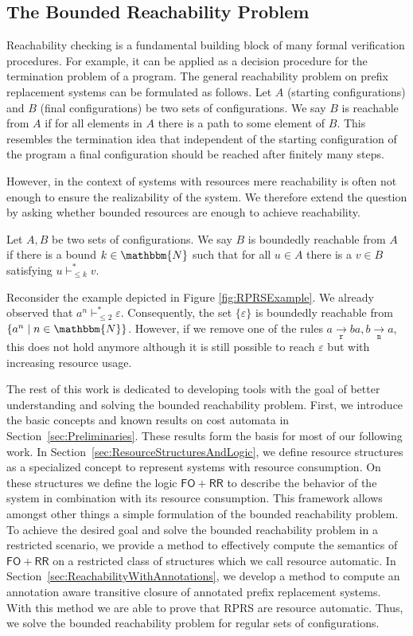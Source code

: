 \documentclass{LMCS}
\newcommand{\apath}[2][]{\xrightarrow[#1]{#2}}
\newcommand{\nat}{\mathbbm{N}}
\newcommand{\eps}{\varepsilon}
\newcommand{\configstepsLesserCost}[2][*]{\vdash^{#1}_{\le #2}}
\newcommand{\FORR}{\ensuremath{\mathsf{FO\!\!+\!\!RR}}}
\newcommand{\rOp}{\ensuremath{\mathtt{r}}}
\newcommand{\nOp}{\ensuremath{\mathtt{n}}}
\newcommand{\RPRS}{\textsf{RPRS}}
\begin{document}
\subsection{The Bounded Reachability Problem}
\label{subsec:BoundedReachability}

Reachability checking is a fundamental building block of many formal
verification procedures. For example, it can be applied as a decision procedure
for the termination problem of a program. The general reachability problem 
on prefix replacement systems can be formulated as follows. Let $A$ (starting 
configurations) and $B$ (final configurations) be two sets of
configurations. We say $B$ is reachable from $A$ if for all elements
in $A$ there is a path to some element of $B$. This resembles the termination
idea that independent of the starting configuration of the program a final
configuration should be reached after finitely many steps.


However, in the context of systems with resources mere reachability is
often not enough to ensure the realizability of the system. 
We therefore extend the question by asking whether bounded
resources are enough to achieve reachability.

\begin{defi}
  Let $A,B$ be two sets of configurations. We say $B$ is boundedly reachable
  from $A$ if there is a bound $k \in \nat$ such that for all $u \in A$ there
  is a $v \in B$ satisfying $u \configstepsLesserCost{k} v$.
\end{defi}

Reconsider the example depicted in Figure \ref{fig:RPRSExample}. We already
observed
that $a^n \configstepsLesserCost{2} \eps$. Consequently, the set $\{\eps\}$ is
boundedly reachable from $\{ a^n \mid n \in \nat\}$. However, if we remove one
of the rules  $a \apath[\rOp]{} ba, b \apath[\nOp]{} a$, this does not
hold anymore although it is still possible to reach $\eps$ but with increasing
resource usage.

The rest of this work is dedicated to developing tools with the goal of better
understanding and solving the bounded reachability problem. First, we
introduce the basic concepts and known results on cost automata in
Section~\ref{sec:Preliminaries}. These results form the basis for most of our
following work. In Section~\ref{sec:ResourceStructuresAndLogic}, we define
resource structures as a specialized concept to represent systems with resource
consumption. On these structures we define the logic \FORR{} to describe
the behavior of the system in combination with its resource consumption. This
framework allows amongst other things a simple formulation of the bounded reachability problem. To
achieve the desired goal and solve the bounded reachability problem in a
restricted scenario, we provide a method to effectively compute the
semantics of \FORR{} on a restricted class of structures which we call resource
automatic. In Section~\ref{sec:ReachabilityWithAnnotations}, we develop a method
to compute an annotation aware transitive closure of annotated prefix
replacement systems. With this method we are able to prove that \RPRS{} are
resource automatic. Thus, we solve the bounded reachability problem for regular
sets of configurations. 
\end{document}
